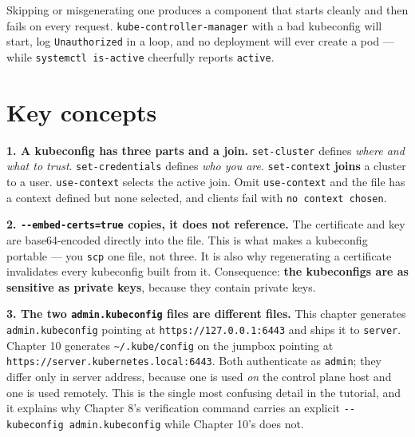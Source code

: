 \documentclass[11pt,oneside]{report}
\begin{document}
Skipping or
misgenerating one
produces a component
that starts cleanly
and then fails on
every request.
\texttt{kube-}\allowbreak{}\texttt{controller-}\allowbreak{}\texttt{manager}
with a bad
kubeconfig will
start, log
\texttt{Unauthorized}
in a loop, and no
deployment will ever
create a pod ---
while
\texttt{systemctl\ is-}\allowbreak{}\texttt{active}
cheerfully reports
\texttt{active}.

\hypertarget{key-concepts-5}{%
\section{Key
concepts}\label{key-concepts-5}}

\textbf{1. A
kubeconfig has three
parts and a join.}
\texttt{set-cluster}
defines \emph{where
and what to trust}.
\texttt{set-credentials}
defines \emph{who
you are}.
\texttt{set-context}
\textbf{joins} a
cluster to a user.
\texttt{use-context}
selects the active
join. Omit
\texttt{use-context}
and the file has a
context defined but
none selected, and
clients fail with
\texttt{no\ context\ chosen}.

\textbf{2.
\texttt{-\/-embed-}\allowbreak{}\texttt{certs=true}
copies, it does not
reference.} The
certificate and key
are base64-encoded
directly into the
file. This is what
makes a kubeconfig
portable --- you
\texttt{scp} one
file, not three. It
is also why
regenerating a
certificate
invalidates every
kubeconfig built
from it.
Consequence:
\textbf{the
kubeconfigs are as
sensitive as private
keys}, because they
contain private
keys.

\textbf{3. The two
\texttt{admin.}\allowbreak{}\texttt{kubeconfig}
files are different
files.} This chapter
generates
\texttt{admin.}\allowbreak{}\texttt{kubeconfig}
pointing at
\texttt{https:}\allowbreak{}\texttt{/}\allowbreak{}\texttt{/}\allowbreak{}\texttt{127.}\allowbreak{}\texttt{0.}\allowbreak{}\texttt{0.}\allowbreak{}\texttt{1:}\allowbreak{}\texttt{6443}
and ships it to
\texttt{server}.
Chapter 10 generates
\texttt{\textasciitilde{}/.kube/config}
on the jumpbox
pointing at
\texttt{https:}\allowbreak{}\texttt{/}\allowbreak{}\texttt{/}\allowbreak{}\texttt{server.}\allowbreak{}\texttt{kubernetes.}\allowbreak{}\texttt{local:}\allowbreak{}\texttt{6443}.
Both authenticate as
\texttt{admin}; they
differ only in
server address,
because one is used
\emph{on} the
control plane host
and one is used
remotely. This is
the single most
confusing detail in
the tutorial, and it
explains why Chapter
8's verification
command carries an
explicit
\texttt{-\/-kubeconfig\ admin.}\allowbreak{}\texttt{kubeconfig}
while Chapter 10's
does not.
\end{document}
